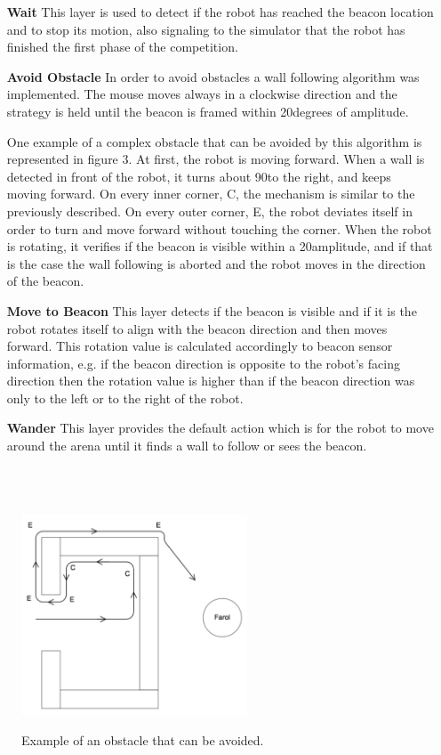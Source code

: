 \documentclass[oribibl]{llncs}
\begin{document}
\begin{itemize}
  \item[\textbf{Wait}]
  This layer is used to detect if the robot has reached the beacon location and to stop its motion, also signaling to the simulator that the robot has finished the first phase of the competition.
  \item[\textbf{Avoid Obstacle}]
  In order to avoid obstacles a wall following algorithm was implemented. The mouse moves always in a clockwise direction and the strategy is held until the beacon is framed within 20\textdegree degrees of amplitude.
  
  One example of a complex obstacle that can be avoided by this algorithm is represented in figure 3. At first, the robot is moving forward. When a wall is detected in front of the robot, it turns about 90\textdegree to the right, and keeps moving forward. On every inner corner,  C, the mechanism is similar to the previously described. On every outer corner, E, the robot deviates itself in order to turn and move forward without touching the corner. When the robot is rotating, it verifies if the beacon is visible within a 20\textdegree amplitude, and if that is the case the wall following is aborted and the robot moves in the direction of the beacon.
  
  \item[\textbf{Move to Beacon}]
  This layer detects if the beacon is visible and if it is the robot rotates itself to align with the beacon direction and then moves forward. This rotation value is calculated accordingly to beacon sensor information, e.g. if the beacon direction is opposite to the robot's facing direction then the rotation value is higher than if the beacon direction was only to the left or to the right of the robot.
  
  \item[\textbf{Wander}]
  This layer provides the default action which is for the robot to move around the arena until it finds a wall to follow or sees the beacon.
\end{itemize}
\hfill \\
\hfill \\
\begin{figure}
  \centering
  \includegraphics[width=0.6\textwidth]{obstaculo1.png}
  \label{fig:obstaculo1}
  \caption{Example of an obstacle that can be avoided.}
\end{figure}
\end{document}
